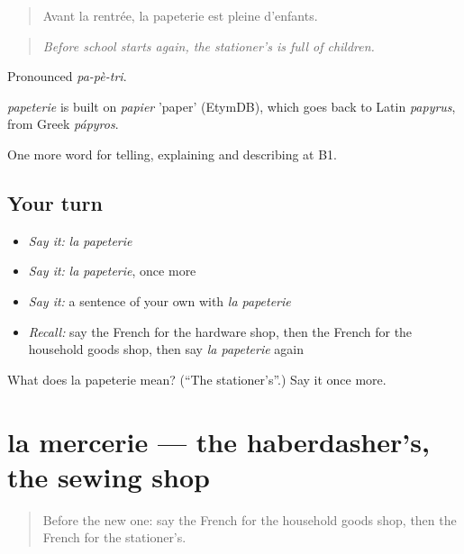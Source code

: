 \begin{quote}
Avant la rentrée, la papeterie est pleine d'enfants.
\end{quote}

\begin{quote}
\emph{Before school starts again, the stationer's is full of children.}
\end{quote}

Pronounced \emph{pa-pè-tri}.

\begin{cousinweb}
\emph{papeterie} is built on \emph{papier} 'paper' (EtymDB), which goes back to Latin \emph{papyrus}, from Greek \emph{pápyros}.
\end{cousinweb}

\begin{grammarlens}[title={What you've built}]
One more word for telling, explaining and describing at B1.
\end{grammarlens}

\subsection*{Your turn}
\begin{itemize}
\raggedright
  \item \emph{Say it:} \emph{la papeterie}
  \item \emph{Say it:} \emph{la papeterie}, once more
  \item \emph{Say it:} a sentence of your own with \emph{la papeterie}
  \item \emph{Recall:} say the French for the hardware shop, then the French for the household goods shop, then say \emph{la papeterie} again
\end{itemize}

\begin{tcolorbox}[breakable,colback=teal!4,colframe=teal!35!black,title={Before you move on}]
What does la papeterie mean? (\textquotedblleft{}The stationer’s\textquotedblright{}.) Say it once more.
\end{tcolorbox}
\section[la mercerie]{la mercerie — the haberdasher’s, the sewing shop}

\label{lesson:FR-C445-mercerie}



\begin{quote}
Before the new one: say the French for the household goods shop, then the French for the stationer’s.
\end{quote}

